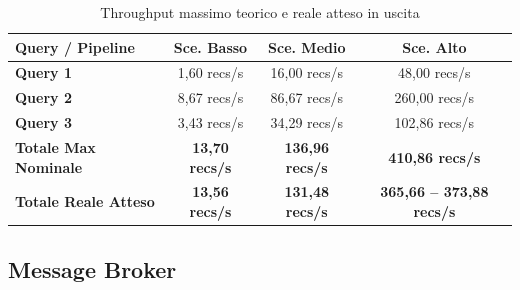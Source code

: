 \documentclass[conference]{IEEEtran}
\begin{document}
\begin{table}[htbp]
\centering
\caption{Throughput massimo teorico e reale atteso in uscita}
\label{tab:max_throughput_expected}
\scriptsize
\setlength{\tabcolsep}{2.5pt}
\begin{tabular}{lccc}
\toprule
\textbf{Query / Pipeline} & \textbf{Sce. Basso} & \textbf{Sce. Medio} & \textbf{Sce. Alto} \\
\midrule
\textbf{Query 1} & 1,60 recs/s & 16,00 recs/s & 48,00 recs/s \\
\textbf{Query 2} & 8,67 recs/s & 86,67 recs/s & 260,00 recs/s \\
\textbf{Query 3} & 3,43 recs/s & 34,29 recs/s & 102,86 recs/s \\
\midrule
\textbf{Totale Max Nominale} & \textbf{13,70 recs/s} & \textbf{136,96 recs/s} & \textbf{410,86 recs/s} \\
\textbf{Totale Reale Atteso} & \textbf{13,56 recs/s} & \textbf{131,48 recs/s} & \textbf{365,66 -- 373,88 recs/s} \\
\bottomrule
\end{tabular}
\end{table}

\subsection{Message Broker}\label{subsec:kafka_integration}
\end{document}
